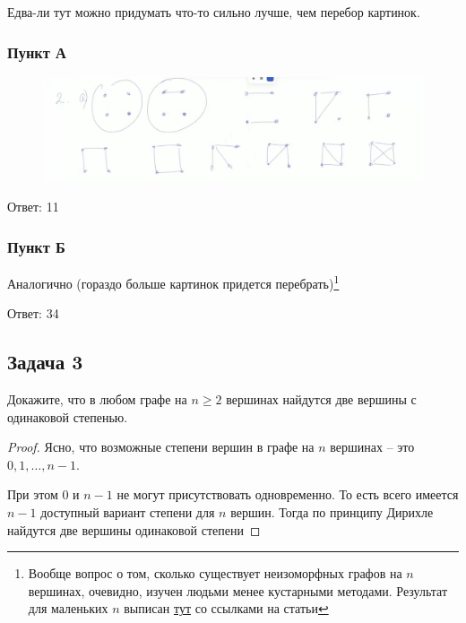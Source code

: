 \begin{solution*}
Едва-ли тут можно придумать что-то сильно лучше, чем перебор картинок.

\subsubsection{Пункт А}

\begin{figure}[H]
    \centering
    \includegraphics[width=1\linewidth]{Figures/sem08_task2.png}
\end{figure}

Ответ: 11

\subsubsection{Пункт Б}

Аналогично (гораздо больше картинок придется перебрать)\footnote{Вообще вопрос о том, сколько существует неизоморфных графов на $n$ вершинах, очевидно, изучен людьми менее кустарными методами. Результат для маленьких $n$ выписан \href{https://oeis.org/A000088}{тут} со ссылками на статьи}

Ответ: 34

\end{solution*}

\subsection{Задача 3}

Докажите, что в любом графе на $n \geq 2$ вершинах найдутся две вершины с одинаковой
степенью.

\begin{proof}
Ясно, что возможные степени вершин в графе на $n$ вершинах -- это $0, 1, \ldots, n - 1$.

При этом 0 и $n-1$ не могут присутствовать одновременно. То есть всего имеется $n-1$ доступный вариант степени для $n$ вершин. Тогда по принципу Дирихле найдутся две вершины одинаковой степени
\end{proof}

